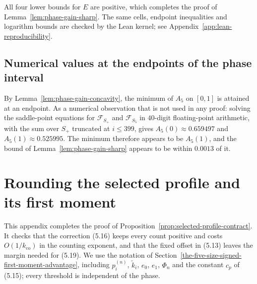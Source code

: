 \documentclass[a4paper,10pt,reqno]{amsart}
\numberwithin{equation}{section}
\theoremstyle{plain}
\theoremstyle{remark}
\begin{document}
All four lower bounds for \(E\) are positive, which completes the proof of
Lemma~\ref{lem:phase-gain-sharp}. The same cells, endpoint inequalities and
logarithm bounds are checked by the Lean kernel; see
Appendix~\ref{app:lean-reproducibility}.

\subsection{Numerical values at the endpoints of the phase interval}
\label{app:phase-gain-numerics}

By Lemma~\ref{lem:phase-gain-concavity}, the minimum of $A_5$ on $[0,1]$ is
attained at an endpoint. As a numerical
observation that is not used in any proof: solving the saddle-point
equations for $\mathcal F_{S_+}$ and $\mathcal F_{S_5}$ in $40$-digit
floating-point arithmetic, with the sum over $S_+$ truncated at $i\le399$, gives
$A_5(0)\approx0.659497$ and $A_5(1)\approx0.525995$. The minimum therefore
appears to be $A_5(1)$, and the bound of Lemma~\ref{lem:phase-gain-sharp}
appears to be within $0.0013$ of it.

\section{Rounding the selected profile and its first moment}
\label{app:profile-rounding-proof}

This appendix completes the proof of
Proposition~\ref{prop:selected-profile-contract}. It checks that the
correction (5.16) keeps every count positive and costs
$O(1/k_{\mathrm{co}})$ in the counting exponent, and that the fixed offset
in (5.13) leaves the margin needed for (5.19). We use the notation of
Section~\ref{the-five-size-signed-first-moment-advantage}, including
$p_i^{(n)}$, $\widetilde k_i$, $e_0$, $e_1$, $\Phi_n$ and the constant $c_p$
of (5.15); every threshold is independent of the phase.
\end{document}
